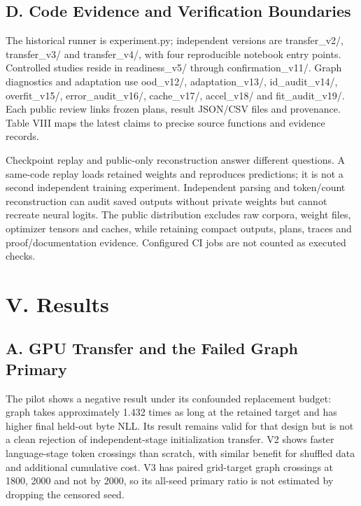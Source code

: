 \documentclass[10pt,letterpaper,twocolumn]{article}
\begin{document}
\subsection*{D. Code Evidence and Verification Boundaries}
The historical runner is experiment.py; independent versions are transfer\_\allowbreak{}v2/\allowbreak{}, transfer\_\allowbreak{}v3/\allowbreak{} and transfer\_\allowbreak{}v4/\allowbreak{}, with four reproducible notebook entry points. Controlled studies reside in readiness\_\allowbreak{}v5/\allowbreak{} through confirmation\_\allowbreak{}v11/\allowbreak{}. Graph diagnostics and adaptation use ood\_\allowbreak{}v12/\allowbreak{}, adaptation\_\allowbreak{}v13/\allowbreak{}, id\_\allowbreak{}audit\_\allowbreak{}v14/\allowbreak{}, overfit\_\allowbreak{}v15/\allowbreak{}, error\_\allowbreak{}audit\_\allowbreak{}v16/\allowbreak{}, cache\_\allowbreak{}v17/\allowbreak{}, accel\_\allowbreak{}v18/\allowbreak{} and fit\_\allowbreak{}audit\_\allowbreak{}v19/\allowbreak{}. Each public review links frozen plans, result JSON/\allowbreak{}CSV files and provenance. Table VIII maps the latest claims to precise source functions and evidence records.

Checkpoint replay and public-only reconstruction answer different questions. A same-code replay loads retained weights and reproduces predictions; it is not a second independent training experiment. Independent parsing and token/\allowbreak{}count reconstruction can audit saved outputs without private weights but cannot recreate neural logits. The public distribution excludes raw corpora, weight files, optimizer tensors and caches, while retaining compact outputs, plans, traces and proof/\allowbreak{}documentation evidence. Configured CI jobs are not counted as executed checks.

\section*{V. Results}
\subsection*{A. GPU Transfer and the Failed Graph Primary}
The pilot shows a negative result under its confounded replacement budget: graph takes approximately 1.432 times as long at the retained target and has higher final held-out byte NLL. Its result remains valid for that design but is not a clean rejection of independent-stage initialization transfer. V2 shows faster language-stage token crossings than scratch, with similar benefit for shuffled data and additional cumulative cost. V3 has paired grid-target graph crossings at 1800, 2000 and not by 2000, so its all-seed primary ratio is not estimated by dropping the censored seed.
\end{document}
